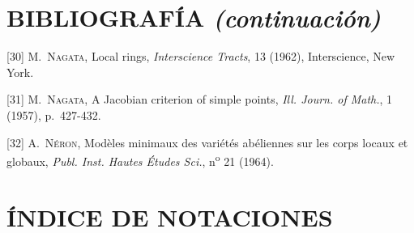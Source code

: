 \clearpage
{}
{}
\section*{BIBLIOGRAFÍA \textit{(continuación)}}

\begingroup
\small
\setlength{\parindent}{0pt}
\setlength{\parskip}{3pt}
[30] M.~\textsc{Nagata}, Local rings, \emph{Interscience Tracts}, 13 (1962),
Interscience, New York.

[31] M.~\textsc{Nagata}, A Jacobian criterion of simple points,
\emph{Ill. Journ. of Math.}, 1 (1957), p.~427-432.

[32] A.~\textsc{Néron}, Modèles minimaux des variétés abéliennes sur les corps
locaux et globaux, \emph{Publ. Inst. Hautes Études Sci.}, n\textsuperscript{o}
21 (1964).

\clearpage
{}
{}
\section*{ÍNDICE DE NOTACIONES}


